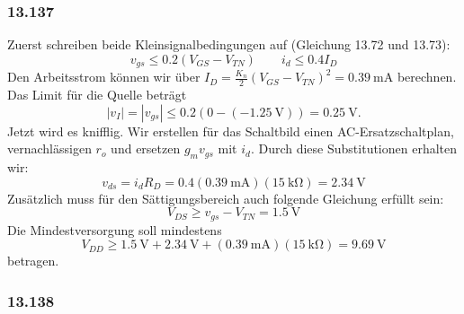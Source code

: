\documentclass[11pt,a4paper,titlepage]{article}
\begin{document}
\subsubsection*{13.137}
Zuerst schreiben beide Kleinsignalbedingungen auf (Gleichung 13.72 und 13.73):
\[ v_{gs} \leq 0.2(V_{GS} - V_{TN}) \qquad i_d \leq 0.4I_D \]
Den Arbeitsstrom können wir über $ I_D = \frac{K_n}{2}(V_{GS} - V_{TN})^2 = \SI{0.39}{\milli\ampere} $ berechnen. Das Limit für die Quelle beträgt
\[ |v_I| = |v_{gs}| \leq 0.2(0-(-\SI{1.25}{\volt})) = \SI{0.25}{\volt}. \]
Jetzt wird es knifflig. Wir erstellen für das Schaltbild einen AC-Ersatzschaltplan, vernachlässigen $ r_o $ und ersetzen $ g_mv_{gs} $ mit $ i_d $. Durch diese Substitutionen erhalten wir:
\[ v_{ds} = i_dR_D = 0.4(\SI{0.39}{\milli\ampere})(\SI{15}{\kilo\ohm}) = \SI{2.34}{\volt} \]
Zusätzlich muss für den Sättigungsbereich auch folgende Gleichung erfüllt sein:
\[ V_{DS} \geq v_{gs} - V_{TN} = \SI{1.5}{\volt} \]
Die Mindestversorgung soll mindestens
\[ V_{DD} \geq \SI{1.5}{\volt} + \SI{2.34}{\volt} + (\SI{0.39}{\milli\ampere})(\SI{15}{\kilo\ohm}) = \SI{9.69}{\volt} \] 
betragen.

\subsubsection*{13.138}
\end{document}
